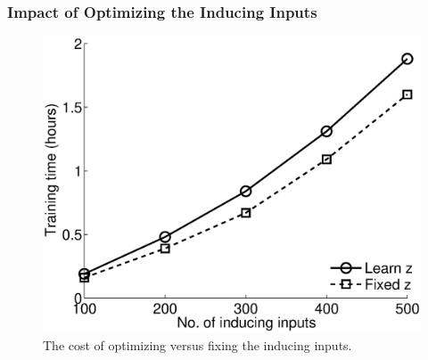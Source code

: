 \subsubsection{Impact of Optimizing the Inducing Inputs}
\begin{figure}
\includegraphics[scale=0.4]{figures/sarcosTime.eps}
\caption{The cost of optimizing versus fixing the inducing inputs.}
\label{fig:time}
\end{figure}
